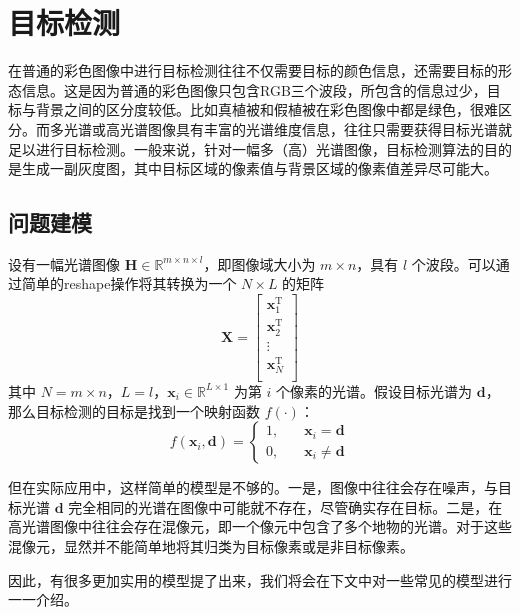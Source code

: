 \section{目标检测}
在普通的彩色图像中进行目标检测往往不仅需要目标的颜色信息，还需要目标的形态信息。这是因为普通的彩色图像只包含RGB三个波段，所包含的信息过少，目标与背景之间的区分度较低。比如真植被和假植被在彩色图像中都是绿色，很难区分。而多光谱或高光谱图像具有丰富的光谱维度信息，往往只需要获得目标光谱就足以进行目标检测。一般来说，针对一幅多（高）光谱图像，目标检测算法的目的是生成一副灰度图，其中目标区域的像素值与背景区域的像素值差异尽可能大。

\subsection{问题建模}
设有一幅光谱图像 \(\mathbf{H} \in \mathbb{R}^{m \times n \times l}\)，即图像域大小为 \(m\times n\)，具有 \(l\) 个波段。可以通过简单的reshape操作将其转换为一个 \(N \times L\) 的矩阵
\[
    \mathbf{X} = \begin{bmatrix}
        \bm{x}_{1}^{\mathrm{T}} \\
        \bm{x}_{2}^{\mathrm{T}} \\
        \vdots                  \\
        \bm{x}_{N}^{\mathrm{T}} \\
    \end{bmatrix}
\]
其中 \(N=m \times n\)，\(L=l\)，\(\bm{x}_{i} \in \mathbb{R}^{L \times 1}\) 为第 \(i\) 个像素的光谱。假设目标光谱为 \(\bm{d}\)，那么目标检测的目标是找到一个映射函数 \(f(\cdot)\)：
\[
    f(\bm{x}_{i}, \bm{d}) = \left\{
    \begin{aligned}
        1, & \quad \bm{x}_{i} = \bm{d}    \\
        0, & \quad \bm{x}_{i} \neq \bm{d}
    \end{aligned} \right.
\]

但在实际应用中，这样简单的模型是不够的。一是，图像中往往会存在噪声，与目标光谱 \(\bm{d}\) 完全相同的光谱在图像中可能就不存在，尽管确实存在目标。二是，在高光谱图像中往往会存在混像元，即一个像元中包含了多个地物的光谱。对于这些混像元，显然并不能简单地将其归类为目标像素或是非目标像素。

因此，有很多更加实用的模型提了出来，我们将会在下文中对一些常见的模型进行一一介绍。

